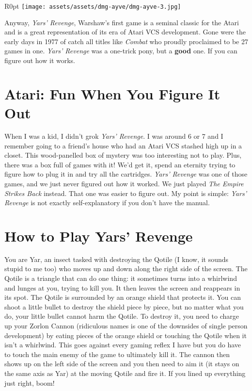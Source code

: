 \documentclass{book}
\begin{document}
\begin{wrapfigure}{R}{0pt} \texttt{[image: assets/assets/dmg-ayve/dmg-ayve-3.jpg]}\end{wrapfigure}
Anyway, \emph{Yars’ Revenge}, Warshaw’s first game is a seminal classic for the Atari and is a great representation of its era of Atari VCS development. Gone were the early days in 1977 of catch all titles like \emph{Combat} who proudly proclaimed to be 27 games in one. \emph{Yars’ Revenge} was a one-trick pony, but a \textbf{good} one. If you can figure out how it works.

\FloatBarrier\needspace{5pt}\section*{Atari: Fun When You Figure It Out}\nopagebreak[4]

When I was a kid, I didn’t grok \emph{Yars’ Revenge}. I was around 6 or 7 and I remember going to a friend’s house who had an Atari VCS stashed high up in a closet. This wood-panelled box of mystery was too interesting not to play. Plus, there was a box full of games with it! We’d get it, spend an eternity trying to figure how to plug it in and try all the cartridges. \emph{Yars’ Revenge} was one of those games, and we just never figured out how it worked. We just played \emph{The Empire Strikes Back} instead. That one was easier to figure out. My point is simple: \emph{Yars’ Revenge} is not exactly self-explanatory if you don’t have the manual.

\FloatBarrier\needspace{5pt}\section*{How to Play Yars’ Revenge}\nopagebreak[4]

You are Yar, an insect tasked with destroying the Qotile (I know, it sounds stupid to me too) who moves up and down along the right side of the screen. The Qotile is a triangle that can do one thing: it sometimes turns into a whirlwind and lunges at you, trying to kill you. It then leaves the screen and reappears in its spot. The Qotile is surrounded by an orange shield that protects it. You can shoot a little bullet to destroy the shield piece by piece, but no matter what you do, your little bullet cannot harm the Qotile. To destroy it, you need to charge up your Zorlon Cannon (ridiculous names is one of the downsides of single person development) by eating pieces of the orange shield or touching the Qotile when it isn’t a whirlwind. This goes against every gaming reflex I have but you do have to touch the main enemy of the game to ultimately kill it. The cannon then shows up on the left side of the screen and you then need to aim it (it stays on the same axis as Yar) at the moving Qotile and fire it. If you lined up everything just right, boom!
\end{document}
